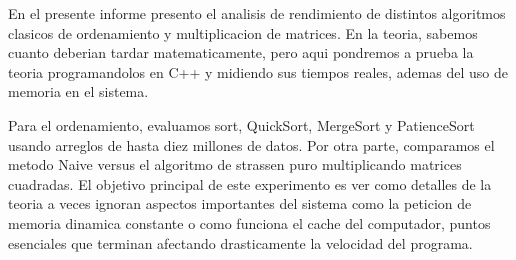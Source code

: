 En el presente informe presento el analisis de rendimiento de distintos algoritmos clasicos de ordenamiento y multiplicacion de matrices. En la teoria, sabemos cuanto deberian tardar matematicamente, pero aqui pondremos a prueba la teoria programandolos en C++ y midiendo sus tiempos reales, ademas del uso de memoria en el sistema.

\medskip

Para el ordenamiento, evaluamos sort, QuickSort, MergeSort y PatienceSort usando arreglos de hasta diez millones de datos. Por otra parte, comparamos el metodo Naive versus el algoritmo de strassen puro multiplicando matrices cuadradas. El objetivo principal de este experimento es ver como detalles de la teoria a veces ignoran aspectos importantes del sistema como la peticion de memoria dinamica constante o como funciona el cache del computador, puntos esenciales que terminan afectando drasticamente la velocidad del programa.